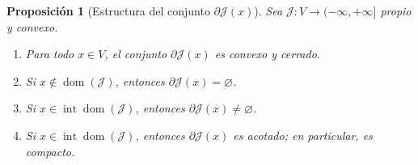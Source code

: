 \documentclass[12pt]{book}
\theoremstyle{definition}
\theoremstyle{plain}
\newtheorem{proposicion}{Proposición}[section]
\theoremstyle{remark}
\begin{document}
\begin{proposicion}[Estructura del conjunto
$\partial\mathcal{J}(x)$]
\label{prop:estructura}
Sea $\mathcal{J}\colon V\to(-\infty,+\infty]$ propio y convexo.
\begin{enumerate}
  \item[(a)] Para todo $x\in V$, el conjunto
        $\partial\mathcal{J}(x)$ es convexo y cerrado.
  \item[(b)] Si $x\notin\operatorname{dom}(\mathcal{J})$, entonces
        $\partial\mathcal{J}(x)=\varnothing$.
  \item[(c)] Si $x\in\operatorname{int}\operatorname{dom}(\mathcal{J})$,
        entonces $\partial\mathcal{J}(x)\neq\varnothing$.
  \item[(d)] Si $x\in\operatorname{int}\operatorname{dom}(\mathcal{J})$,
        entonces $\partial\mathcal{J}(x)$ es acotado; en particular, es
        compacto.
\end{enumerate}
\end{proposicion}
\end{document}
